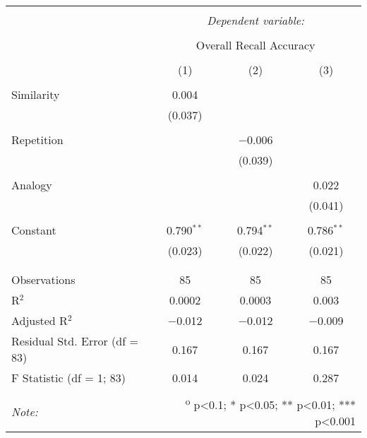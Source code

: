 
\begin{table}[!htbp] \centering
  \caption{}
  \label{table:fol}
  \small
  \renewcommand{\arraystretch}{0.6}
\begin{tabular}{@{\extracolsep{5pt}}lccc}
\\[-1.8ex]\hline
\hline \\[-1.8ex]
 & \multicolumn{3}{c}{\textit{Dependent variable:}} \\
\cline{2-4}
\\[-1.8ex] & \multicolumn{3}{c}{Overall Recall Accuracy} \\
\\[-1.8ex] & (1) & (2) & (3)\\
\hline \\[-1.8ex]
 Similarity & 0.004 &  &  \\
  & (0.037) &  &  \\
  & & & \\
 Repetition &  & $-$0.006 &  \\
  &  & (0.039) &  \\
  & & & \\
 Analogy &  &  & 0.022 \\
  &  &  & (0.041) \\
  & & & \\
 Constant & 0.790$^{**}$ & 0.794$^{**}$ & 0.786$^{**}$ \\
  & (0.023) & (0.022) & (0.021) \\
  & & & \\
\hline \\[-1.8ex]
Observations & 85 & 85 & 85 \\
R$^{2}$ & 0.0002 & 0.0003 & 0.003 \\
Adjusted R$^{2}$ & $-$0.012 & $-$0.012 & $-$0.009 \\
Residual Std. Error (df = 83) & 0.167 & 0.167 & 0.167 \\
F Statistic (df = 1; 83) & 0.014 & 0.024 & 0.287 \\
\hline
\hline \\[-1.8ex]
\textit{Note:}  & \multicolumn{3}{r}{\textsuperscript{o} p<0.1; * p<0.05; ** p<0.01; *** p<0.001} \\
\end{tabular}
\end{table}
